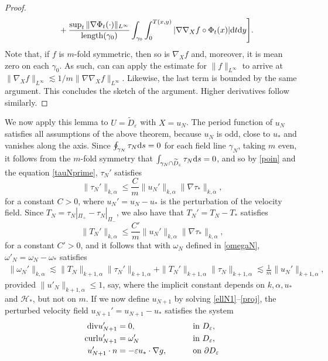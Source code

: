 \documentclass[11pt]{article}
\theoremstyle{plain}
\numberwithin{equation}{section}
\theoremstyle{remark}
\renewcommand{\div}{{\rm div}}
\newcommand{\rmd}{{\rm d}}
\newcommand{\curl}{{\rm curl}}
\newcommand{\ve}{{\varepsilon}}
\newcommand{\pa}{\partial}
\begin{document}
\begin{proof}
\begin{align*}
&\qquad + \frac{\sup_t\| \nabla \Phi_t(\cdot ) \|_{L^\infty}}{{\rm length}(\gamma_0)}\int_{\gamma_0}\int_0^{T(x,y)} |\nabla \nabla_X  f\circ \Phi_t(x)| \rmd t \rmd y\Bigg].
\end{align*}
Note that, if $f$ is  $m$-fold symmetric, then so is $\nabla_X f$ and, moreover, it is mean zero on each $\gamma_0$.  As such, can can apply the estimate for $\|f\|_{L^\infty}$ to arrive at $\|\nabla_X f\|_{L^\infty}\lesssim 1/m \|\nabla \nabla_X f\|_{L^\infty}.$ Likewise, the last term is bounded by the same argument.  This concludes the sketch of the argument.  Higher derivatives follow similarly.
\end{proof}

We now apply this lemma to $U = \widetilde{D}_\ve$ with $X = u_N$.  The period function of $u_N$ satisfies all assumptions of the above theorem, because $u_N$ is odd, close to $u_*$ and vanishes along the axis. 
Since $\oint_{\gamma_N} \tau_N \rmd s = 0$
for each field line $\gamma_N$, taking $m$ even, it follows from the
$m$-fold symmetry that $\int_{\gamma_N \cap \widetilde{D}_\ve} \tau_N \rmd s = 0$,
and so by \eqref{poin} and the equation \eqref{tauNprime}, $\tau_N'$ satisfies
\begin{equation}
  \label{}
  \|\tau_N'\|_{k,\alpha} \leq \frac{C}{m}  \|u_N'\|_{k, \alpha}\|\nabla \tau_*\|_{k, \alpha},
\end{equation}
for a constant $C > 0$,
where $u_N' = u_N - u_*$ is the perturbation of the velocity field.
Since $T_N = \tau_N|_{\Pi_+} - \tau_N|_{\Pi_-}$, we also have that $T_N' = T_N - T_*$ satisfies
\begin{equation}
  \label{}
  \|T_N'\|_{k, \alpha} \leq \frac{C'}{m}\|u_N'\|_{k, \alpha}\|\nabla \tau_*\|_{k, \alpha},
\end{equation}
for a constant $C' >0$,
and it follows that with $\omega_N$ defined in \eqref{omegaN}, $\omega'_N = \omega_N - \omega_*$
satisfies
\begin{align}
  \label{}
  \|\omega_N'\|_{k, \alpha}
  \lesssim \|T_N\|_{k+1, \alpha}\| \tau_N'\|_{k+1, \alpha} 
  + \|T_N'\|_{k + 1, \alpha}\|\tau_N\|_{k+1,\alpha} 
  \lesssim \frac{1}{m}  \| u_N'\|_{k+1, \alpha},
\end{align}
provided $\|u'_N\|_{k+1, \alpha} \leq 1$, say,
where the implicit constant depends on $k, \alpha, u_*$ and $\mathcal{H}_*$, but not on $m$.
If we now define $u_{N+1}$ by solving \eqref{ellN1}--\eqref{proj}, the perturbed velocity
field $u_{N+1}' = u_{N+1} - u_*$ satisfies the system
\begin{alignat}{2}
  \label{}
  \div u_{N+1}' &= 0, &&\qquad \text{ in } D_\ve,\\
  \curl u_{N+1}' &= \omega_N'&&\qquad \text{ in } D_\ve,\\
  u_{N+1}'\cdot n &= -\ve u_*\cdot \nabla g,&&\qquad \text{ on } \pa D_\ve
\end{alignat}
\end{document}

